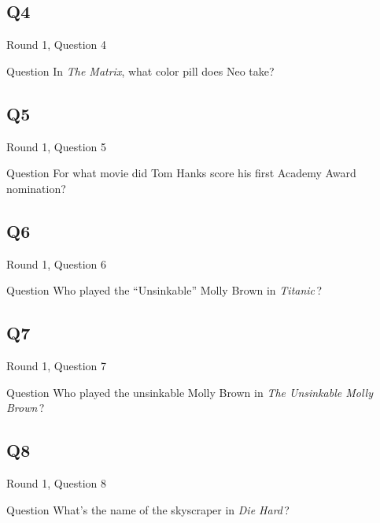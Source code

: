 \documentclass[11pt]{beamer}
\begin{document}
\subsection*{Q4}
\begin{frame}[t]{Round 1, Question 4}
\vspace{2em}
\begin{block}{Question}
In \emph{The Matrix}, what color pill does Neo take?
\end{block}
\end{frame}
    

\subsection*{Q5}
\begin{frame}[t]{Round 1, Question 5}
\vspace{2em}
\begin{block}{Question}
For what movie did Tom Hanks score his first Academy Award nomination?
\end{block}
\end{frame}
    

\subsection*{Q6}
\begin{frame}[t]{Round 1, Question 6}
\vspace{2em}
\begin{block}{Question}
Who played the ``Unsinkable'' Molly Brown in \emph{Titanic}\,?
\end{block}
\end{frame}
    

\subsection*{Q7}
\begin{frame}[t]{Round 1, Question 7}
\vspace{2em}
\begin{block}{Question}
Who played the unsinkable Molly Brown in \emph{The Unsinkable Molly Brown}\,?
\end{block}
\end{frame}
    

\subsection*{Q8}
\begin{frame}[t]{Round 1, Question 8}
\vspace{2em}
\begin{block}{Question}
What's the name of the skyscraper in \emph{Die Hard}\,?
\end{block}
\end{frame}
    
\end{document}
